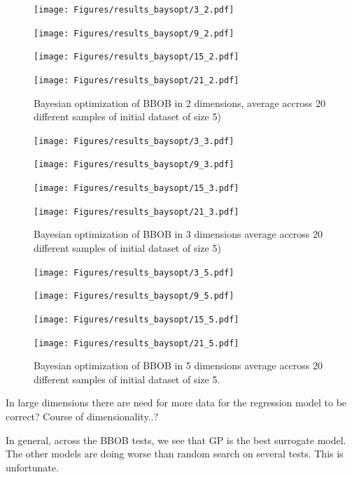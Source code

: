 \begin{figure}[H]
  \centering
  \begin{minipage}[b]{0.49\textwidth}
   \texttt{[image: Figures/results\_baysopt/3\_2.pdf]}
  \end{minipage}
  \hfill
  \begin{minipage}[b]{0.49\textwidth}
    \texttt{[image: Figures/results\_baysopt/9\_2.pdf]}
   \end{minipage}
   \begin{minipage}[b]{0.49\textwidth}
    \texttt{[image: Figures/results\_baysopt/15\_2.pdf]}
   \end{minipage}
   \hfill
   \begin{minipage}[b]{0.49\textwidth}
     \texttt{[image: Figures/results\_baysopt/21\_2.pdf]}
    \end{minipage}
  \caption{Bayesian optimization of BBOB in 2 dimensions, average accross 20 different samples of initial dataset of size 5)}
  \label{BBOB_bayesOpt}
\end{figure}

\begin{figure}[H]
  \centering
  \begin{minipage}[b]{0.49\textwidth}
   \texttt{[image: Figures/results\_baysopt/3\_3.pdf]}
  \end{minipage}
  \hfill
  \begin{minipage}[b]{0.49\textwidth}
    \texttt{[image: Figures/results\_baysopt/9\_3.pdf]}
   \end{minipage}
   \begin{minipage}[b]{0.49\textwidth}
    \texttt{[image: Figures/results\_baysopt/15\_3.pdf]}
   \end{minipage}
   \hfill
   \begin{minipage}[b]{0.49\textwidth}
     \texttt{[image: Figures/results\_baysopt/21\_3.pdf]}
    \end{minipage}
  \caption{Bayesian optimization of BBOB in 3 dimensions average accross 20 different samples of initial dataset of size 5)}
  \label{BBOB_bayesOpt}
\end{figure}


\begin{figure}[H]
  \centering
  \begin{minipage}[b]{0.49\textwidth}
   \texttt{[image: Figures/results\_baysopt/3\_5.pdf]}
  \end{minipage}
  \hfill
  \begin{minipage}[b]{0.49\textwidth}
    \texttt{[image: Figures/results\_baysopt/9\_5.pdf]}
   \end{minipage}
   \begin{minipage}[b]{0.49\textwidth}
    \texttt{[image: Figures/results\_baysopt/15\_5.pdf]}
   \end{minipage}
   \hfill
   \begin{minipage}[b]{0.49\textwidth}
     \texttt{[image: Figures/results\_baysopt/21\_5.pdf]}
    \end{minipage}
  \caption{Bayesian optimization of BBOB in 5 dimensions average accross 20 different samples of initial dataset of size 5.}
  \label{BBOB_bayesOpt5}
\end{figure}

In large dimensions there are need for more data for the regression model to be correct? Course of dimensionality..?


In general, across the BBOB tests, we see that GP is the best surrogate model. The other models 
are doing worse than random search on several tests. This is unfortunate.